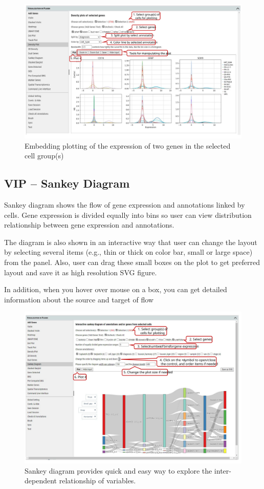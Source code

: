 \documentclass[
]{article}
\begin{document}
\begin{figure}
\centering
\includegraphics{figures/F15_label.svg}
\caption{Embedding plotting of the expression of two genes in the selected cell group(s)}
\end{figure}

\hypertarget{vip-sankey-diagram}{%
\subsection{VIP -- Sankey Diagram}\label{vip-sankey-diagram}}

Sankey diagram shows the flow of gene expression and annotations linked by cells. Gene expression is divided equally into bins so user can view distribution relationship between gene expression and annotations.

The diagram is also shown in an interactive way that user can change the layout by selecting several items (e.g., thin or thick on color bar, small or large space) from the panel. Also, user can drag these small boxes on the plot to get preferred layout and save it as high resolution SVG figure.

In addition, when you hover over mouse on a box, you can get detailed information about the source and target of flow

\begin{figure}
\centering
\includegraphics{figures/F16_label.svg}
\caption{Sankey diagram provides quick and easy way to explore the inter-dependent relationship of variables.}
\end{figure}
\end{document}
